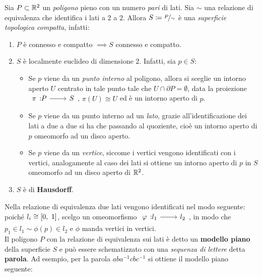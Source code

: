 \begin{observe}
	Sia $P\subset\mathbb{R}^2$ un \textit{poligono} pieno con un numero \textit{pari} di lati. Sia $\sim$ una relazione di equivalenza che identifica i lati a $2$ a $2$. Allora $S\coloneqq\nicefrac{P}{\sim}$ è una \textit{superficie topologica compatta}, infatti:
		\begin{enumerate}
			\item  $P$ è connesso e compatto $\implies S$ connesso e compatto.
			\item $S$ è localmente euclideo di dimensione $2$. Infatti, sia $p\in S$:
			\begin{itemize}
				\item Se $p$ viene da un \textit{punto interno} al poligono, allora si sceglie un intorno aperto $U$ centrato in tale punto tale che $U\cap\partial{P}=\emptyset$, data la proiezione $\funz \pi P S$, $\pi(U)\cong U$ ed è un intorno aperto di $p$.
				\item Se $p$ viene da un punto interno ad un \textit{lato}, grazie all'identificazione dei lati a due a due si ha che passando al quoziente, cioè un intorno aperto di $p$ omeomorfo ad un disco aperto.
				\item Se $p$ viene da un \textit{vertice}, siccome i vertici vengono identificati con i vertici, analogamente al caso dei lati si ottiene un intorno aperto di $p$ in $S$ omeomorfo ad un disco aperto di $\mathbb{R}^2$.
			\end{itemize}  
			\item $S$ è di \textbf{Hausdorff}.
		\end{enumerate}
	Nella relazione di equivalenza due lati vengono identificati nel modo seguente: poiché $l_i\cong\left[0,\ 1\right]$, scelgo un omeomorfismo $\funz{\phi}{l_1}{l_2}$, in modo che $p_1\in l_1 \sim \phi(p)\in l_2$ e $\phi$ manda vertici in vertici.\\
	Il poligono $P$ con la relazione di equivalenza sui lati è detto un \textbf{modello piano} della superficie $S$ e può essere schematizzato con una \textit{sequenza di lettere} detta \textbf{parola}. Ad esempio, per la parola $aba^{-1}cbc^{-1}$ si ottiene il modello piano seguente:
		\begin{center}

\end{center}
\end{observe}
